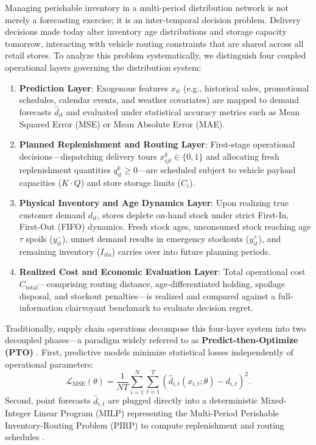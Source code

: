 \documentclass[11pt,a4paper]{article}
\theoremstyle{definition}
\theoremstyle{remark}
\begin{document}
Managing perishable inventory in a multi-period distribution network is not merely a forecasting exercise; it is an inter-temporal decision problem. Delivery decisions made today alter inventory age distributions and storage capacity tomorrow, interacting with vehicle routing constraints that are shared across all retail stores. To analyze this problem systematically, we distinguish four coupled operational layers governing the distribution system:
\begin{enumerate}[label=(\roman*)]
    \item \textbf{Prediction Layer}: Exogenous features $x_{it}$ (e.g., historical sales, promotional schedules, calendar events, and weather covariates) are mapped to demand forecasts $\hat{d}_{it}$ and evaluated under statistical accuracy metrics such as Mean Squared Error (MSE) or Mean Absolute Error (MAE).
    \item \textbf{Planned Replenishment and Routing Layer}: First-stage operational decisions---dispatching delivery tours $x_{ijt}^k \in \{0, 1\}$ and allocating fresh replenishment quantities $q_{it}^k \ge 0$---are scheduled subject to vehicle payload capacities ($K \cdot Q$) and store storage limits ($C_i$).
    \item \textbf{Physical Inventory and Age Dynamics Layer}: Upon realizing true customer demand $d_{it}$, stores deplete on-hand stock under strict First-In, First-Out (FIFO) dynamics. Fresh stock ages, unconsumed stock reaching age $\tau$ spoils ($y_{it}^-$), unmet demand results in emergency stockouts ($y_{it}^+$), and remaining inventory ($I_{ita}$) carries over into future planning periods.
    \item \textbf{Realized Cost and Economic Evaluation Layer}: Total operational cost $C_{\text{total}}$---comprising routing distance, age-differentiated holding, spoilage disposal, and stockout penalties---is realized and compared against a full-information clairvoyant benchmark to evaluate decision regret.
\end{enumerate}

Traditionally, supply chain operations decompose this four-layer system into two decoupled phases---a paradigm widely referred to as \textbf{Predict-then-Optimize (PTO)} \citep{elmachtoub2022smart,mandi2024decision}. First, predictive models minimize statistical losses independently of operational parameters:
\begin{equation*}
    \mathcal{L}_{\text{MSE}}(\theta) = \frac{1}{N T} \sum_{i=1}^N \sum_{t=1}^T \left( \hat{d}_{i,t}(x_{i,t}; \theta) - d_{i,t} \right)^2.
\end{equation*}
Second, point forecasts $\hat{d}_{i,t}$ are plugged directly into a deterministic Mixed-Integer Linear Program (MILP) representing the Multi-Period Perishable Inventory-Routing Problem (PIRP) to compute replenishment and routing schedules \citep{coelho2014thirty,alvarez2020formulations}.
\end{document}
